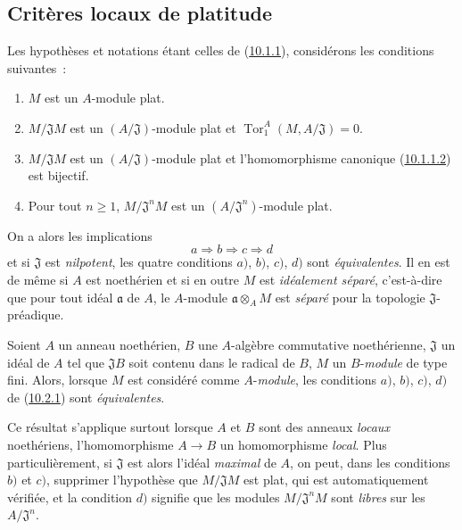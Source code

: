\subsection{Critères locaux de platitude}
\label{subsection:0.10.2-fr}

\begin{env}[10.2.1]
\label{0.10.2.1-fr}
Les hypothèses et notations étant celles de
(\hyperref[0.10.1.1-fr]{10.1.1}), considérons les conditions suivantes~:
\begin{enumerate}
  \item[$a)$] $M$ est un $A$-module plat.
  \item[$b)$] $M/\mathfrak{J}M$ est un $(A/\mathfrak{J})$-module plat et
    $\operatorname{Tor}_1^A(M,A/\mathfrak{J})=0$.
  \item[$c)$] $M/\mathfrak{J}M$ est un $(A/\mathfrak{J})$-module plat et
    l'homomorphisme canonique (\hyperref[0.10.1.1.2-fr]{10.1.1.2}) est
    bijectif.
  \item[$d)$] Pour tout $n\geq1$, $M/\mathfrak{J}^nM$ est un
    $(A/\mathfrak{J}^n)$-module plat.
\end{enumerate}
On a alors les implications
\[
  a\Rightarrow b\Rightarrow c\Rightarrow d
\]
et si $\mathfrak{J}$ est \emph{nilpotent}, les quatre conditions $a)$, $b)$,
$c)$, $d)$ sont \emph{équivalentes}. Il en est de même si $A$ est noethérien
et si en outre $M$ est \emph{idéalement séparé}, c'est-à-dire que pour tout
idéal $\mathfrak{a}$ de $A$, le $A$-module $\mathfrak{a}\otimes_A M$ est
\emph{séparé} pour la topologie $\mathfrak{J}$-préadique.
\end{env}

\begin{env}[10.2.2]
\label{0.10.2.2-fr}
Soient $A$ un anneau noethérien, $B$ une $A$-algèbre commutative noethérienne,
$\mathfrak{J}$ un idéal de $A$ tel que $\mathfrak{J}B$ soit contenu dans le
radical de $B$, $M$ un $B$-\emph{module} de type fini. Alors, lorsque $M$ est
considéré comme $A$-\emph{module}, les conditions $a)$, $b)$, $c)$, $d)$ de
(\hyperref[0.10.2.1-fr]{10.2.1}) sont \emph{équivalentes}.

Ce résultat s'applique surtout lorsque $A$ et $B$ sont des anneaux
\emph{locaux} noethériens, l'homomorphisme $A\to B$ un homomorphisme
\emph{local}. Plus particulièrement, si $\mathfrak{J}$ est alors l'idéal
\emph{maximal} de $A$, on peut, dans les conditions $b)$ et $c)$, supprimer
l'hypothèse que $M/\mathfrak{J}M$ est plat, qui est automatiquement vérifiée,
et la condition $d)$ signifie que les modules $M/\mathfrak{J}^nM$ sont
\emph{libres} sur les $A/\mathfrak{J}^n$.
\end{env}

